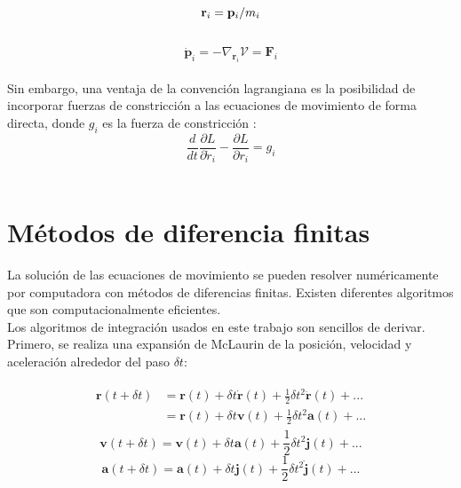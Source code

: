 \begin{equation}
    \mathbf{r}_i = \mathbf{p}_i/m_i \\
\end{equation}\\
\begin{equation}
    \mathbf{\dot p}_i = -\nabla_{\mathbf{r}_i}\mathcal{V} = \mathbf{F}_i
\end{equation}\\

Sin embargo, una ventaja de la convención lagrangiana es la posibilidad de incorporar fuerzas de constricción a las ecuaciones de movimiento de forma directa, donde $g_i$ es la fuerza de constricción \cite{raabe2017}:\\

\begin{equation} \label{lagrangeeqconstraint}
    \frac{d}{dt}\frac{\partial L}{\partial \dot r_i} - \frac{\partial L}{\partial r_i} = g_i
\end{equation}\\

\section{Métodos de diferencia finitas}

La solución de las ecuaciones de movimiento se pueden resolver numéricamente por computadora con métodos de diferencias finitas. Existen diferentes algoritmos que son computacionalmente eficientes.\\

Los algoritmos de integración usados en este trabajo son sencillos de derivar. Primero, se realiza una expansión de McLaurin de la posición, velocidad y aceleración alrededor del paso $\delta t$:

\begin{align} \label{taylorexpr}
\begin{split}
    \mathbf{r}(t + \delta t) &= \mathbf{r}(t)+\delta t\dot{\mathbf{r}}(t) + \frac{1}{2}\delta t^2 \ddot{\mathbf{r}}(t)+...\\
                             &= \mathbf{r}(t)+\delta t\mathbf{v}(t) + \frac{1}{2}\delta t^2 \mathbf{a}(t)+...
\end{split}
\end{align}
\begin{equation}\label{taylorexpv}
    \mathbf{v}(t + \delta t) = \mathbf{v}(t)+\delta t\mathbf{a}(t) + \frac{1}{2}\delta t^2 \mathbf{j}(t)+...
\end{equation}
\begin{equation}\label{taylorexpa}
    \mathbf{a}(t + \delta t) = \mathbf{a}(t)+\delta t\mathbf{j}(t) + \frac{1}{2}\delta t^2 \dot{\mathbf{j}}(t)+...
\end{equation}\\


